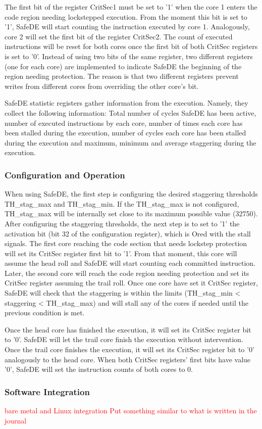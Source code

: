 The first bit of the register CritSec1 must be set to '1' when the core 1 enters the code region needing lockstepped execution. From the moment this bit is set to '1', SafeDE will start counting the instruction executed by core 1. Analogously, core 2 will set the first bit of the register CritSec2. The count of executed instructions will be reset for both cores once the first bit of both CritSec registers is set to '0'. Instead of using two bits of the same register, two different registers (one for each core) are implemented to indicate SafeDE the beginning of the region needing protection. The reason is that two different registers prevent writes from different cores from overriding the other core's bit.

SafeDE statistic registers gather information from the execution. Namely, they collect the following information: Total number of cycles SafeDE has been active, number of executed instructions by each core, number of times each core has been stalled during the execution, number of cycles each core has been stalled during the execution and maximum, minimum and average staggering during the execution.


\bigskip

\subsubsection{Configuration and Operation}

When using SafeDE, the first step is configuring the desired staggering thresholds TH\_stag\_max and TH\_stag\_min. If the TH\_stag\_max is not configured, TH\_stag\_max will be internally set close to its maximum possible value (32750). After configuring the staggering thresholds, the next step is to set to '1' the activation bit (bit 32 of the configuration register), which is Ored with the stall signals. The first core reaching the code section that needs lockstep protection will set its CritSec register first bit to '1'. From that moment, this core will assume the head roll and SafeDE will start counting each committed instruction. Later, the second core will reach the code region needing protection and set its CritSec register assuming the trail roll. Once one core have set it CritSec register, SafeDE will check that the staggering is within the limits (TH\_stag\_min < staggering < TH\_stag\_max) and will stall any of the cores if needed until the previous condition is met.  

Once the head core has finished the execution, it will set its CritSec register bit to '0'. SafeDE will let the trail core finish the execution without intervention. Once the trail core finishes the execution, it will set its CritSec register bit to '0' analogously to the head core. When both CritSec registers' first bits have value '0', SafeDE will set the instruction counts of both cores to 0.
\bigskip

\subsubsection{Software Integration}
\label{section:software_integration}
\textcolor{red}{bare metal and Linux integration}
\textcolor{red}{Put something similar to what is written in the journal}
\bigskip